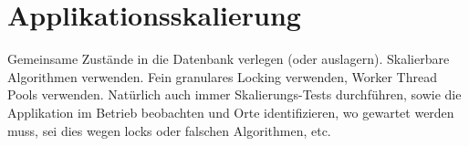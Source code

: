 \section{Applikationsskalierung}
Gemeinsame Zustände in die Datenbank verlegen (oder auslagern). Skalierbare Algorithmen verwenden. Fein granulares Locking verwenden, Worker Thread Pools verwenden. Natürlich auch immer Skalierungs-Tests durchführen, sowie die Applikation im Betrieb beobachten und Orte identifizieren, wo gewartet werden muss, sei dies wegen locks oder falschen Algorithmen, etc.